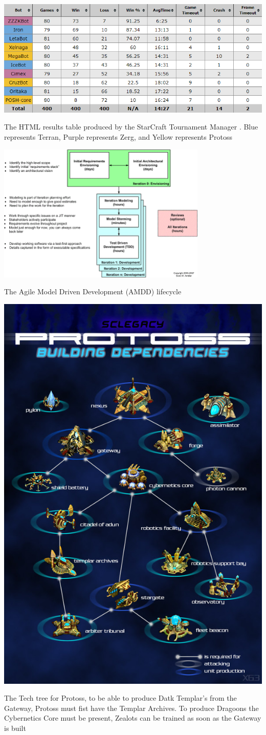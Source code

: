 \documentclass[journal]{IEEEtran}
\begin{document}
	\appendix
	\begin{table}[]
		\centering
		\includegraphics[width=\textwidth]{STMResultsWithBot}
		\caption{The HTML results table produced by the StarCraft Tournament Manager \cite{Tournament}. Blue represents Terran, Purple represents Zerg, and Yellow represents Protoss}
		\label{Table2}
	\end{table}
	\begin{table}
		\centering
		\includegraphics[width=0.75\textwidth]{AMDD}
		\centering\caption{The Agile Model Driven Development (AMDD) lifecycle \cite{AMDD}}
		\label{Fig10}
		\centering
		\includegraphics[width= 0.5 \textwidth]{ProtossTechTree}
		\centering\caption{The Tech tree for Protoss, to be able to produce Datk Templar's from the Gateway, Protoss must fist have the Templar Archives. To produce Dragoons the Cybernetics Core must be present, Zealots can be trained as soon as the Gateway is built \cite{Tech}}
		\label{Fig11}
	\end{table}
\end{document}
